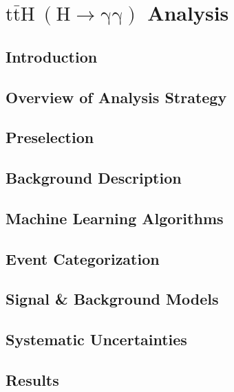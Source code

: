 \chapter{$\mathrm{t\bar{t}H~(H \to \gamma \gamma)}$ Analysis}

\section{Introduction} \label{sec:tth_intro}


\section{Overview of Analysis Strategy} \label{sec:tth_analysis_strategy}


\section{Preselection} \label{sec:tth_presel}


\section{Background Description} \label{sec:tth_background_description}


\section{Machine Learning Algorithms} \label{sec:tth_mvas}


\section{Event Categorization} \label{sec:tth_event_categorization}


\section{Signal \& Background Models} \label{sec:tth_sig_bkg_models}


\section{Systematic Uncertainties} \label{sec:tth_systematic_uncertainties}


\section{Results} \label{sec:tth_results}

